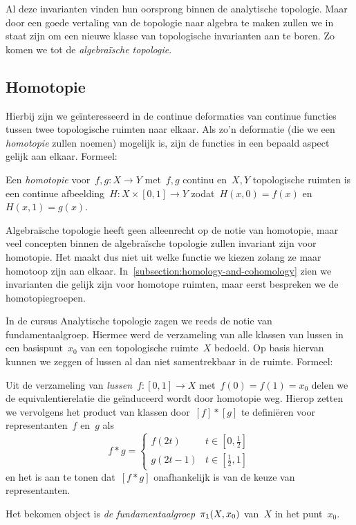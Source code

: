 \documentclass[a4paper,11pt]{article}
\begin{document}
Al deze invarianten vinden hun oorsprong binnen de analytische topologie. Maar door een goede vertaling van de topologie naar algebra te maken zullen we in staat zijn om een nieuwe klasse van topologische invarianten aan te boren. Zo komen we tot de \emph{algebra\"ische topologie}.

\subsection{Homotopie}
Hierbij zijn we ge\"interesseerd in de continue deformaties van continue functies tussen twee topologische ruimten naar elkaar. Als zo'n deformatie (die we een \emph{homotopie} zullen noemen) mogelijk is, zijn de functies in een bepaald aspect gelijk aan elkaar. Formeel:

\begin{definition}
  Een \emph{homotopie} voor~$f,g\colon X\to Y$ met~$f,g$ continu en~$X,Y$ topologische ruimten is een continue afbeelding~$H\colon X\times[0,1]\to Y$ zodat~$H(x,0)=f(x)$ en~$H(x,1)=g(x)$.
\end{definition}

Algebra\"ische topologie heeft geen alleenrecht op de notie van homotopie, maar veel concepten binnen de algebra\"ische topologie zullen invariant zijn voor homotopie. Het maakt dus niet uit welke functie we kiezen zolang ze maar homotoop zijn aan elkaar. In~\cref{subsection:homology-and-cohomology} zien we invarianten die gelijk zijn voor homotope ruimten, maar eerst bespreken we de homotopiegroepen.

In de cursus Analytische topologie zagen we reeds de notie van fundamentaalgroep. Hiermee werd de verzameling van alle klassen van lussen in een basispunt~$x_0$ van een topologische ruimte~$X$ bedoeld. Op basis hiervan kunnen we zeggen of lussen al dan niet samentrekbaar in de ruimte. Formeel:

\begin{definition}
  Uit de verzameling van \emph{lussen}~$f\colon[0,1]\to X$ met~$f(0)=f(1)=x_0$ delen we de equivalentierelatie die ge\"induceerd wordt door homotopie weg. Hierop zetten we vervolgens het product van klassen door~$[f]\ast [g]$ te defini\"eren voor representanten~$f$ en~$g$ als
  \begin{equation}
    f\ast g=
      \begin{cases}
        f(2t) & t\in\left[0,\frac{1}{2}\right] \\
        g(2t-1) & t\in\left[\frac{1}{2},1\right]
      \end{cases}
  \end{equation}
  en het is aan te tonen dat~$[f\ast g]$ onafhankelijk is van de keuze van representanten.

  Het bekomen object is \emph{de fundamentaalgroep~$\pi_1(X,x_0)$} van~$X$ in het punt~$x_0$.
\end{definition}
\end{document}
